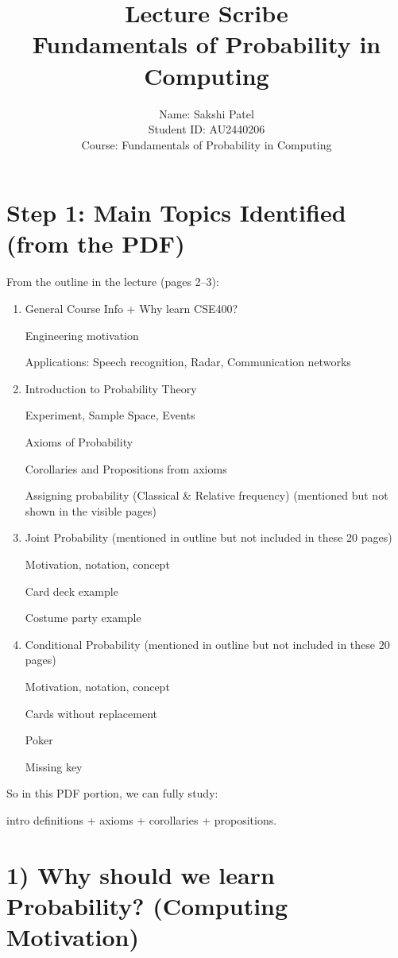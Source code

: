 \documentclass[12pt,a4paper]{article}
\title{\textbf{Lecture Scribe}\\Fundamentals of Probability in Computing}
\author{
Name: Sakshi Patel\\
Student ID: AU2440206\\
Course: Fundamentals of Probability in Computing\\
}
\begin{document}
\date{}
\maketitle
\newpage

\section*{Step 1: Main Topics Identified (from the PDF)}

From the outline in the lecture (pages 2–3):

\begin{enumerate}
\item General Course Info + Why learn CSE400?

Engineering motivation

Applications: Speech recognition, Radar, Communication networks

\item Introduction to Probability Theory

Experiment, Sample Space, Events

Axioms of Probability

Corollaries and Propositions from axioms

Assigning probability (Classical \& Relative frequency) (mentioned but not shown in the visible pages)

\item Joint Probability (mentioned in outline but not included in these 20 pages)

Motivation, notation, concept

Card deck example

Costume party example

\item Conditional Probability (mentioned in outline but not included in these 20 pages)

Motivation, notation, concept

Cards without replacement

Poker

Missing key
\end{enumerate}

So in this PDF portion, we can fully study:

intro definitions + axioms + corollaries + propositions.

\section*{1) Why should we learn Probability? (Computing Motivation)}
\end{document}
